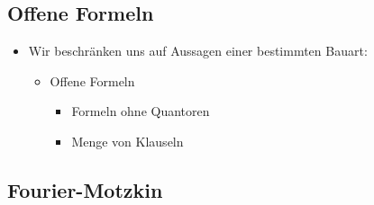 \documentclass{scrartcl}
\begin{document}
\subsection{Offene Formeln}

\begin{itemize}
	\item Wir beschränken uns auf Aussagen einer bestimmten Bauart:
	\begin{itemize}
		\item Offene Formeln
		\begin{itemize}
			\item Formeln ohne Quantoren
			\item Menge von Klauseln
		\end{itemize}
	\end{itemize}
\end{itemize}

\subsection{Fourier-Motzkin}
\end{document}
